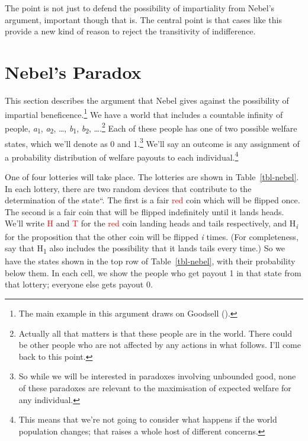 \documentclass[
  11pt,
  letterpaper,
  DIV=11,
  numbers=noendperiod,
  twoside]{scrartcl}
\begin{document}
The point is not just to defend the possibility of impartiality from
Nebel's argument, important though that is. The central point is that
cases like this provide a new kind of reason to reject the transitivity
of indifference.

\section{Nebel's Paradox}\label{sec-nebel}

This section describes the argument that Nebel gives against the
possibility of impartial beneficence.\footnote{The main example in this
  argument draws on Goodsell ().} We
have a world that includes a countable infinity of people,
\emph{a}\textsubscript{1}, \emph{a}\textsubscript{2}, \ldots,
\emph{b}\textsubscript{1}, \emph{b}\textsubscript{2}, \ldots.\footnote{Actually
  all that matters is that these people are in the world. There could be
  other people who are not affected by any actions in what follows. I'll
  come back to this point.} Each of these people has one of two possible
welfare states, which we'll denote as 0 and 1.\footnote{So while we will
  be interested in paradoxes involving unbounded good, none of these
  paradoxes are relevant to the maximisation of expected welfare for any
  individual.} We'll say an outcome is any assignment of a probability
distribution of welfare payouts to each individual.\footnote{This means
  that we're not going to consider what happens if the world population
  changes; that raises a whole host of different concerns.}

One of four lotteries will take place. The lotteries are shown in
Table~\ref{tbl-nebel}. In each lottery, there are two random devices
that contribute to the determination of the state``. The first is a fair
\textcolor{red}{red} coin which will be flipped once. The second is a
fair coin that will be flipped indefinitely until it lands heads. We'll
write \textcolor{red}{H} and \textcolor{red}{T} for the
\textcolor{red}{red} coin landing heads and tails respectively, and
H\textsubscript{\emph{i}} for the proposition that the other coin will
be flipped \emph{i} times. (For completeness, say that
H\textsubscript{1} also includes the possibility that it lands tails
every time.) So we have the states shown in the top row of
Table~\ref{tbl-nebel}, with their probability below them. In each cell,
we show the people who get payout 1 in that state from that lottery;
everyone else gets payout 0.
\end{document}
